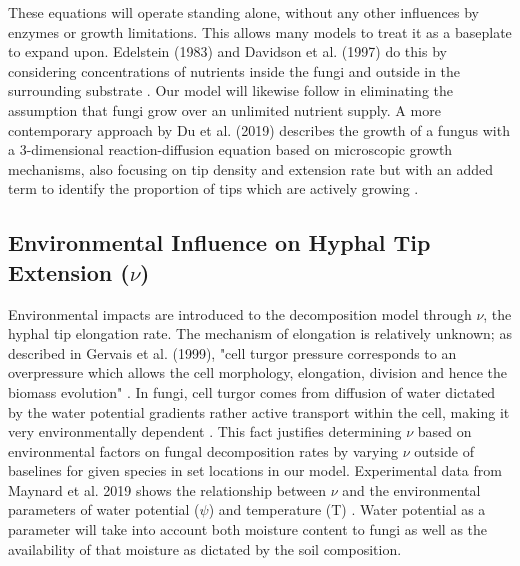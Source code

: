 \documentclass[12pt]{article}
\begin{document}
\begin{multicols}{2}
These equations will operate standing alone, without any other influences by enzymes or growth limitations. This allows many models to treat it as a baseplate to expand upon. Edelstein (1983) and Davidson et al. (1997) do this by considering concentrations of nutrients inside the fungi and outside in the surrounding substrate \cite{Edelstein1983, Davidson2012}. Our model will likewise follow in eliminating the assumption that fungi grow over an unlimited nutrient supply. A more contemporary approach by Du et al. (2019) describes the growth of a fungus with a 3-dimensional reaction-diffusion equation based on microscopic growth mechanisms, also focusing on tip density and extension rate but with an added term to identify the proportion of tips which are actively growing \cite{Du2019}.

\subsection{Environmental Influence on Hyphal Tip Extension ($\nu$)}
Environmental impacts are introduced to the decomposition model through $\nu$, the hyphal tip elongation rate. The mechanism of elongation is relatively unknown; as described in Gervais et al. (1999), "cell turgor pressure corresponds to an overpressure which allows the cell morphology, elongation, division and hence the biomass evolution" \cite{Gervais1999, Steinberg2007}. In fungi, cell turgor comes from diffusion of water dictated by the water potential gradients rather active transport within the cell, making it very environmentally dependent \cite{Gervais1999}. This fact justifies determining $\nu$ based on environmental factors on fungal decomposition rates by varying $\nu$ outside of baselines for given species in set locations in our model. Experimental data from Maynard et al. 2019 shows the relationship between $\nu$ and the environmental parameters of water potential ($\psi$) and temperature (T) \cite{Maynard2019}.  Water potential as a parameter will take into account both moisture content to fungi as well as the availability of that moisture as dictated by the  soil composition.



\end{multicols}
\end{document}
